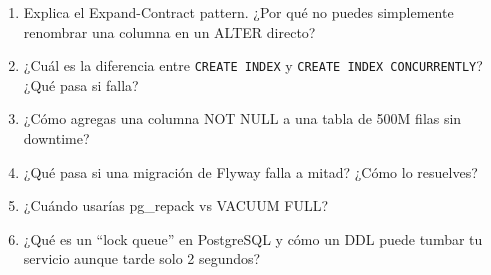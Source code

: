 \begin{entrevistabox}
\begin{enumerate}
  \item Explica el Expand-Contract pattern. ¿Por qué no puedes simplemente renombrar una columna en un ALTER directo?
  \item ¿Cuál es la diferencia entre \texttt{CREATE INDEX} y \texttt{CREATE INDEX CONCURRENTLY}? ¿Qué pasa si falla?
  \item ¿Cómo agregas una columna NOT NULL a una tabla de 500M filas sin downtime?
  \item ¿Qué pasa si una migración de Flyway falla a mitad? ¿Cómo lo resuelves?
  \item ¿Cuándo usarías pg\_repack vs VACUUM FULL?
  \item ¿Qué es un ``lock queue'' en PostgreSQL y cómo un DDL puede tumbar tu servicio aunque tarde solo 2 segundos?
\end{enumerate}
\end{entrevistabox}

